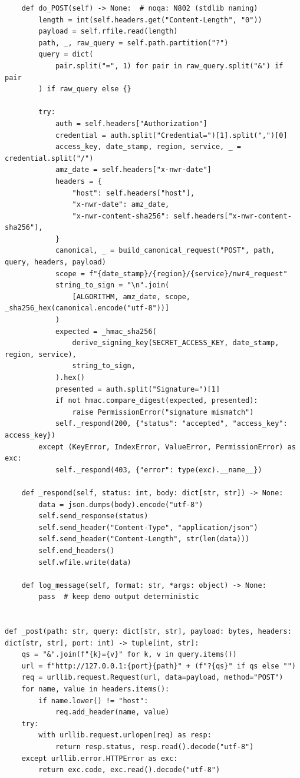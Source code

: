 \begin{verbatim}
    def do_POST(self) -> None:  # noqa: N802 (stdlib naming)
        length = int(self.headers.get("Content-Length", "0"))
        payload = self.rfile.read(length)
        path, _, raw_query = self.path.partition("?")
        query = dict(
            pair.split("=", 1) for pair in raw_query.split("&") if pair
        ) if raw_query else {}

        try:
            auth = self.headers["Authorization"]
            credential = auth.split("Credential=")[1].split(",")[0]
            access_key, date_stamp, region, service, _ = credential.split("/")
            amz_date = self.headers["x-nwr-date"]
            headers = {
                "host": self.headers["host"],
                "x-nwr-date": amz_date,
                "x-nwr-content-sha256": self.headers["x-nwr-content-sha256"],
            }
            canonical, _ = build_canonical_request("POST", path, query, headers, payload)
            scope = f"{date_stamp}/{region}/{service}/nwr4_request"
            string_to_sign = "\n".join(
                [ALGORITHM, amz_date, scope, _sha256_hex(canonical.encode("utf-8"))]
            )
            expected = _hmac_sha256(
                derive_signing_key(SECRET_ACCESS_KEY, date_stamp, region, service),
                string_to_sign,
            ).hex()
            presented = auth.split("Signature=")[1]
            if not hmac.compare_digest(expected, presented):
                raise PermissionError("signature mismatch")
            self._respond(200, {"status": "accepted", "access_key": access_key})
        except (KeyError, IndexError, ValueError, PermissionError) as exc:
            self._respond(403, {"error": type(exc).__name__})

    def _respond(self, status: int, body: dict[str, str]) -> None:
        data = json.dumps(body).encode("utf-8")
        self.send_response(status)
        self.send_header("Content-Type", "application/json")
        self.send_header("Content-Length", str(len(data)))
        self.end_headers()
        self.wfile.write(data)

    def log_message(self, format: str, *args: object) -> None:
        pass  # keep demo output deterministic


def _post(path: str, query: dict[str, str], payload: bytes, headers: dict[str, str], port: int) -> tuple[int, str]:
    qs = "&".join(f"{k}={v}" for k, v in query.items())
    url = f"http://127.0.0.1:{port}{path}" + (f"?{qs}" if qs else "")
    req = urllib.request.Request(url, data=payload, method="POST")
    for name, value in headers.items():
        if name.lower() != "host":
            req.add_header(name, value)
    try:
        with urllib.request.urlopen(req) as resp:
            return resp.status, resp.read().decode("utf-8")
    except urllib.error.HTTPError as exc:
        return exc.code, exc.read().decode("utf-8")



\end{verbatim}
